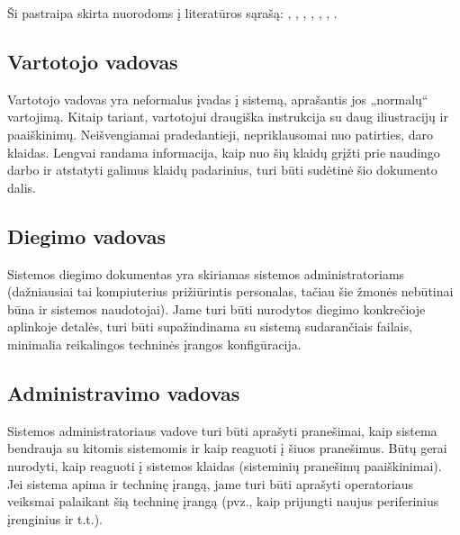 \documentclass{ktuthesis}
\begin{document}
  Ši pastraipa skirta nuorodoms į literatūros sąrašą: \cite{litnet}, \cite{ontologies}, \cite{valstybestarnyba}, \cite{spaudosdraudimas}, \cite{krastoapsauga}, \cite{citationguide}, \cite{velomobilis}.

  \subsection{Vartotojo vadovas}

  Vartotojo vadovas yra neformalus įvadas į sistemą, aprašantis jos „normalų“ vartojimą. Kitaip tariant, vartotojui draugiška instrukcija su daug
  iliustracijų ir paaiškinimų. Neišvengiamai pradedantieji, nepriklausomai nuo patirties, daro klaidas. Lengvai randama informacija, kaip nuo šių
  klaidų grįžti prie naudingo darbo ir atstatyti galimus klaidų padarinius, turi būti sudėtinė šio dokumento dalis.

  \subsection{Diegimo vadovas}

  Sistemos diegimo dokumentas yra skiriamas sistemos administratoriams (dažniausiai tai kompiuterius prižiūrintis personalas, tačiau šie žmonės
  nebūtinai būna ir sistemos naudotojai). Jame turi būti nurodytos diegimo konkrečioje aplinkoje detalės, turi būti supažindinama su sistemą
  sudarančiais failais, minimalia reikalingos techninės įrangos konfigūracija.

  \subsection{Administravimo vadovas}

  Sistemos administratoriaus vadove turi būti aprašyti pranešimai, kaip sistema bendrauja su kitomis sistemomis ir kaip reaguoti į šiuos pranešimus.
  Būtų gerai nurodyti, kaip reaguoti į sistemos klaidas (sisteminių pranešimų paaiškinimai). Jei sistema apima ir techninę įrangą, jame turi būti
  aprašyti operatoriaus veiksmai palaikant šią techninę įrangą (pvz., kaip prijungti naujus periferinius įrenginius ir t.t.).

  \newpage

\end{document}

